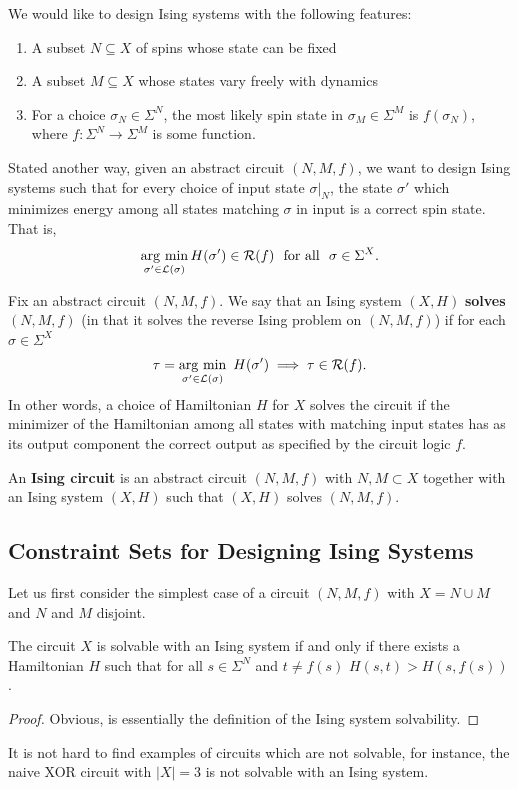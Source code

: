 \documentclass{article}
\begin{document}
We would like to design Ising systems with the following features:
\begin{enumerate}[(1)]
  \item A subset $N \subseteq X$ of spins whose state can be fixed
  \item A subset $M \subseteq X$ whose states vary freely with dynamics
  \item For a choice $\sigma_N \in \Sigma^N$, the most likely spin state in $\sigma_M \in \Sigma^M$ is $f(\sigma_N)$, where $f: \Sigma^N \to \Sigma^M$ is some function.
\end{enumerate}
Stated another way, given an abstract circuit $(N,M,f)$, we want to design Ising systems such that for every choice of input state $\sigma|_N$, the state $\sigma'$ which minimizes energy among all states matching $\sigma$ in input is a correct spin state. That is,
\begin{align*}
  \operatorname*{arg ~ min}_{\sigma' \in \mathcal{L}(\sigma)} H(\sigma') \in \mathcal{R}(f) ~ \text{ for all } ~ \sigma \in \Sigma^X.
\end{align*}

\begin{defn}\label{defn:solves-ising-circuit}
  Fix an abstract circuit $(N, M, f)$. We say that an Ising system $(X, H)$ \textbf{solves} $(N, M, f)$ (in that it solves the reverse Ising problem on $(N,M,f)$) if for each $\sigma \in \Sigma^X$ 
  \begin{align*}
    \tau = \operatorname*{arg ~ min}_{\sigma' \in \mathcal{L}(\sigma)} ~H(\sigma') \implies \tau \in \mathcal{R}(f).
  \end{align*}
  In other words, a choice of Hamiltonian $H$ for $X$ solves the circuit if the minimizer of the Hamiltonian among all states with matching input states has as its output component the correct output as specified by the circuit logic $f$.

  An \textbf{Ising circuit} is an abstract circuit $(N,M,f)$ with $N,M \subset X$ together with an Ising system $(X,H)$ such that $(X,H)$ solves $(N,M,f)$.
\end{defn}

\subsection{Constraint Sets for Designing Ising Systems}
Let us first consider the simplest case of a circuit $(N, M, f)$ with $X = N \cup M$ and $N$ and $M$ disjoint.
\begin{lem}\label{lem:basic_constraints}
  The circuit $X$ is solvable with an Ising system if and only if there exists a Hamiltonian $H$ such that for all $s\in \Sigma^N$ and $t \neq f(s)$ $H(s,t) > H(s,f(s))$.
\end{lem}
\begin{proof}
  Obvious, is essentially the definition of the Ising system solvability.
\end{proof}
It is not hard to find examples of circuits which are not solvable, for instance, the naive XOR circuit with $|X| = 3$ is not solvable with an Ising system.
\end{document}
